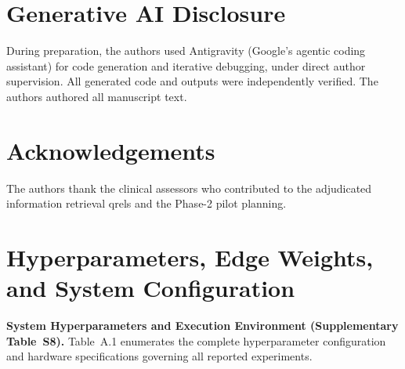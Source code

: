 \documentclass[preprint,12pt,a4paper]{elsarticle}
\begin{document}
\section*{Generative AI Disclosure}
During preparation, the authors used Antigravity (Google's agentic coding assistant)
for code generation and iterative debugging, under direct author
supervision. All generated code and outputs were independently verified. The authors authored
all manuscript text.

\section*{Acknowledgements}
The authors thank the clinical assessors who contributed to the adjudicated information retrieval qrels and the Phase-2 pilot planning.

\FloatBarrier




\appendix
\section{Hyperparameters, Edge Weights, and System Configuration}
\label{app:hyperparams}

\noindent\textbf{System Hyperparameters and Execution Environment (Supplementary Table~S8).}
Table~A.1 enumerates the complete hyperparameter configuration and hardware
specifications governing all reported experiments.
\end{document}
